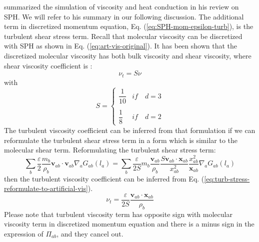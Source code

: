 \documentclass[gmd, manuscript]{copernicus}
\begin{document}
\citet{monaghan2005smoothed} summarized the simulation of viscosity and heat conduction in his review on SPH. We will refer to his summary in our following discussion. The additional term in discretized momentum equation, Eq. (\ref{eq:SPH-mom-epsilon-turb}), is the turbulent shear stress term. 
Recall that molecular viscosity can be discretized with SPH as shown in Eq. (\ref{eq:art-vis-original}). 
It has been shown that the discretized molecular viscosity has both bulk viscosity and shear viscosity, where shear viscosity coefficient is \citep{monaghan2005smoothed}:
\begin{equation}
\nu_t = S \nu
\end{equation}
with
\begin{equation}
S= 
\begin{cases} 
      \dfrac{1}{10} & if  \quad d=3 \\
      \\
     \dfrac{1}{8}  & if  \quad d=2 
\end{cases}
\end{equation}
The turbulent viscosity coefficient can be inferred from that formulation if we can reformulate the turbulent shear stress term in a form which is similar to the molecular shear term.
Reformulating the turbulent shear stress term:
\begin{equation}
\label{eq:turb-stress-reformulate-to-artificial-vis}
 \sum_b \dfrac{\varepsilon}{2} \dfrac{m_b}{\rho_b} \textbf{v}_{ab} \cdot \textbf{v}_{ab} \nabla_a G_{ab}\left(l_a\right)= \sum_b \dfrac{\varepsilon}{2S} m_b \dfrac{\textbf{v}_{ab}}{\rho_b} \dfrac{S \textbf{v}_{ab} \cdot \textbf{x}_{ab}}{x_{ab}^2} \dfrac{x_{ab}^2}{\textbf{x}_{ab}} \nabla_a G_{ab}\left(l_a\right) 
\end{equation}
then the turbulent viscosity coefficient can be inferred from Eq. (\ref{eq:turb-stress-reformulate-to-artificial-vis}).
\begin{equation}
\nu_t = \dfrac{\varepsilon}{2S} \dfrac{\textbf{v}_{ab} \cdot \textbf{x}_{ab}}{\rho_b}
\end{equation}
Please note that turbulent viscosity term has opposite sign with molecular viscosity term in discretized momentum equation and there is a minus sign in the expression of $\Pi_{ab}$, and they cancel out.
\end{document}
